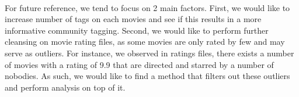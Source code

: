 \paragraph{}
For future reference, we tend to focus on 2 main factors. First, we would like to increase number of tags on each movies and see if this results in a more informative community tagging. Second, we would like to perform further cleansing on movie rating files, as some movies are only rated by few and may serve as outliers. For instance, we observed in ratings files, there exists a number of movies with a rating of 9.9 that are directed and starred by a number of nobodies. As such, we would like to find a method that filters out these outliers and perform analysis on top of it.
